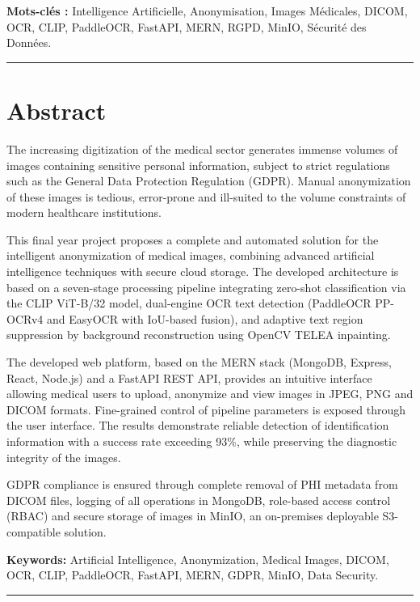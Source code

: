 \textbf{Mots-clés :} Intelligence Artificielle, Anonymisation, Images Médicales, DICOM, OCR, CLIP, PaddleOCR, FastAPI, MERN, RGPD, MinIO, Sécurité des Données.

\vspace{0.8cm}
\hrule
\vspace{0.8cm}

\section*{Abstract}

The increasing digitization of the medical sector generates immense volumes of images containing sensitive personal information, subject to strict regulations such as the General Data Protection Regulation (GDPR). Manual anonymization of these images is tedious, error-prone and ill-suited to the volume constraints of modern healthcare institutions.

This final year project proposes a complete and automated solution for the intelligent anonymization of medical images, combining advanced artificial intelligence techniques with secure cloud storage. The developed architecture is based on a seven-stage processing pipeline integrating zero-shot classification via the CLIP ViT-B/32 model, dual-engine OCR text detection (PaddleOCR PP-OCRv4 and EasyOCR with IoU-based fusion), and adaptive text region suppression by background reconstruction using OpenCV TELEA inpainting.

The developed web platform, based on the MERN stack (MongoDB, Express, React, Node.js) and a FastAPI REST API, provides an intuitive interface allowing medical users to upload, anonymize and view images in JPEG, PNG and DICOM formats. Fine-grained control of pipeline parameters is exposed through the user interface. The results demonstrate reliable detection of identification information with a success rate exceeding 93\%, while preserving the diagnostic integrity of the images.

GDPR compliance is ensured through complete removal of PHI metadata from DICOM files, logging of all operations in MongoDB, role-based access control (RBAC) and secure storage of images in MinIO, an on-premises deployable S3-compatible solution.

\textbf{Keywords:} Artificial Intelligence, Anonymization, Medical Images, DICOM, OCR, CLIP, PaddleOCR, FastAPI, MERN, GDPR, MinIO, Data Security.

\vspace{0.8cm}
\hrule
\vspace{0.8cm}

